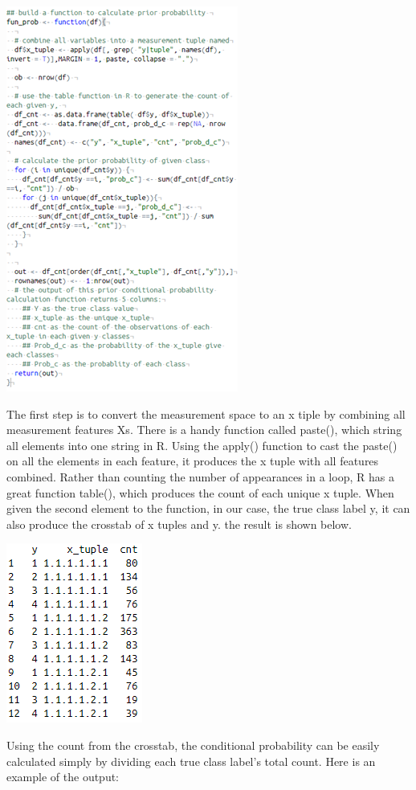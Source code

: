 \documentclass{article}
\begin{document}
\begin{multicols}{2}
\includegraphics{fig4.png}

The first step is to convert the measurement space to an x tiple by combining all measurement features Xs. There is a handy function called paste(), which string all elements into one string in R. Using the apply() function to cast the paste() on all the elements in each feature, it produces the x tuple with all features combined.
Rather than counting the number of appearances in a loop, R has a great function table(), which produces the count of each unique x tuple. When given the second element to the function, in our case, the true class label y, it can also produce the crosstab of x tuples and y. the result is shown below.

\includegraphics{fig5.png}

Using the count from the crosstab, the conditional probability can be easily calculated simply by dividing each true class label's total count. Here is an example of the output:


\end{multicols}
\end{document}
